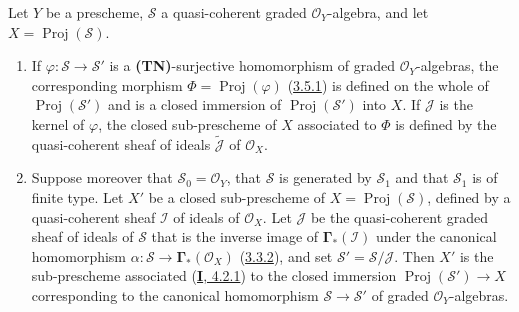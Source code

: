 \begin{proposition}[3.6.2]
\label{II.3.6.2}
Let $Y$ be a prescheme, $\mathcal{S}$ a quasi-coherent graded
$\mathcal{O}_Y$-algebra, and let $X=\operatorname{Proj}(\mathcal{S})$.
\begin{enumerate}
  \item[\rm(i)] If $\varphi:\mathcal{S}\to\mathcal{S}'$ is a
    \textup{\textbf{(TN)}}-surjective homomorphism of graded $\mathcal{O}_Y$-algebras,
    the corresponding morphism
    $\Phi=\operatorname{Proj}(\varphi)$
    \textup{(\hyperref[II.3.5.1]{3.5.1})} is defined on the whole of
    $\operatorname{Proj}(\mathcal{S}')$ and is a closed
    immersion of $\operatorname{Proj}(\mathcal{S}')$ into $X$. If $\mathcal{J}$
    is the kernel of $\varphi$, the closed sub-prescheme of $X$ associated to
    $\Phi$ is defined by the quasi-coherent sheaf of ideals
    $\widetilde{\mathcal{J}}$ of $\mathcal{O}_X$.
  \item[\rm(ii)] Suppose moreover that $\mathcal{S}_0=\mathcal{O}_Y$,
    that $\mathcal{S}$ is generated by $\mathcal{S}_1$ and that $\mathcal{S}_1$
    is of finite type. Let $X'$ be a closed sub-prescheme of
    $X=\operatorname{Proj}(\mathcal{S})$, defined by a quasi-coherent sheaf
    $\mathcal{I}$ of ideals of $\mathcal{O}_X$. Let
    $\mathcal{J}$
    be the quasi-coherent graded sheaf of ideals of $\mathcal{S}$ that is the
    inverse image of $\mathbf{\Gamma}_*(\mathcal{I})$ under the canonical homomorphism
    $\alpha:\mathcal{S}\to\mathbf{\Gamma}_*(\mathcal{O}_X)$
    \textup{(\hyperref[II.3.3.2]{3.3.2})}, and set
    $\mathcal{S}'=\mathcal{S}/\mathcal{J}$. Then $X'$ is the sub-prescheme
    associated \textup{(\hyperref[I.4.2.1]{\textbf{I}, 4.2.1})} to the closed immersion
    $\operatorname{Proj}(\mathcal{S}')\to X$ corresponding to the canonical
    homomorphism $\mathcal{S}\to\mathcal{S}'$ of graded
    $\mathcal{O}_Y$-algebras.
\end{enumerate}
\end{proposition}


